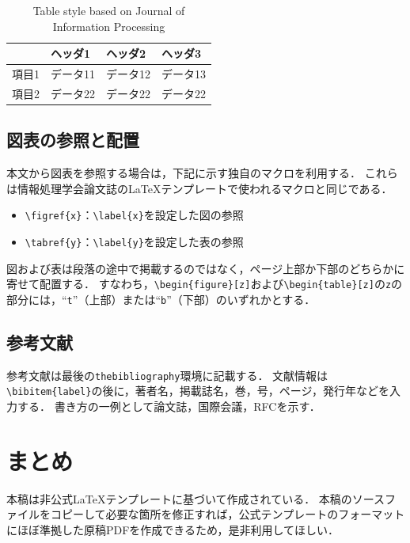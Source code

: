 \documentclass[a4j,9pt,twocolumn,uplatex]{jsarticle}
\begin{document}
\begin{table}[tb]
    \centering
    \footnotesize	%
    \caption{Table style based on Journal of Information Processing}
    \label{tab:sample}
    \begin{tabular}{l|lll}
        \hline\hline
         & ヘッダ1 & ヘッダ2 & ヘッダ3 \\ 
        \hline 
        項目1 & データ11 & データ12 & データ13 \\
        項目2 & データ22 & データ22 & データ22 \\  
        \hline 
    \end{tabular}
\end{table}

\subsection{図表の参照と配置}
本文から図表を参照する場合は，下記に示す独自のマクロを利用する．
これらは情報処理学会論文誌の\LaTeX テンプレートで使われるマクロと同じである．
\begin{itemize}
    \item \verb|\figref{x}|：\verb|\label{x}|を設定した図の参照
    \item \verb|\tabref{y}|：\verb|\label{y}|を設定した表の参照
\end{itemize}

図および表は段落の途中で掲載するのではなく，ページ上部か下部のどちらかに寄せて配置する．
すなわち，\verb|\begin{figure}[z]|および\verb|\begin{table}[z]|の\texttt{z}の部分には，``\texttt{t}''（上部）または``\texttt{b}''（下部）のいずれかとする．

\subsection{参考文献}
参考文献は最後の\verb|thebibliography|環境に記載する．
文献情報は\verb|\bibitem{label}|の後に，著者名，掲載誌名，巻，号，ページ，発行年などを入力する．
書き方の一例として論文誌\cite{Matsuoka2022}，国際会議\cite{Suzuki2013}，RFC\cite{MIPv4}を示す．


\section{まとめ}

本稿は非公式\LaTeX テンプレートに基づいて作成されている．
本稿のソースファイルをコピーして必要な箇所を修正すれば，公式テンプレートのフォーマットにほぼ準拠した原稿PDFを作成できるため，是非利用してほしい．
\end{document}
